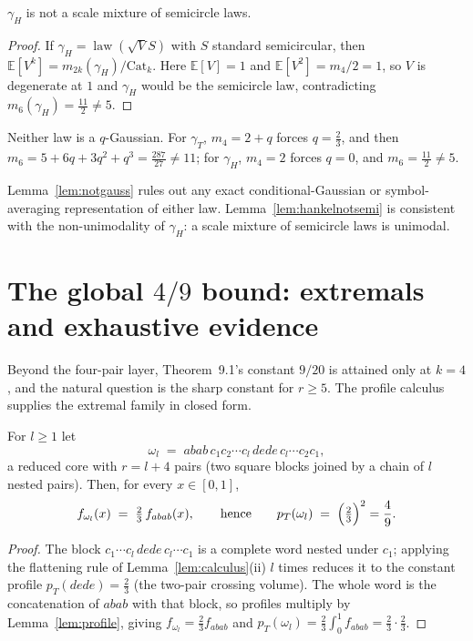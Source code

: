 \begin{lemma}\label{lem:hankelnotsemi}
$\gamma_H$ is not a scale mixture of semicircle laws.
\end{lemma}

\begin{proof}
If $\gamma_H=\operatorname{law}(\sqrt V S)$ with $S$ standard semicircular,
then $\mathbb E[V^k]=m_{2k}(\gamma_H)/\mathrm{Cat}_k$.  Here
$\mathbb E[V]=1$ and $\mathbb E[V^2]=m_4/2=1$, so $V$ is degenerate at $1$
and $\gamma_H$ would be the semicircle law, contradicting
$m_6(\gamma_H)=\tfrac{11}2\ne5$.
\end{proof}

\begin{lemma}\label{lem:notq}
Neither law is a $q$-Gaussian.  For $\gamma_T$, $m_4=2+q$ forces
$q=\tfrac23$, and then $m_6=5+6q+3q^2+q^3=\tfrac{287}{27}\ne11$; for
$\gamma_H$, $m_4=2$ forces $q=0$, and $m_6=\tfrac{11}2\ne5$.
\end{lemma}

Lemma~\ref{lem:notgauss} rules out any exact conditional-Gaussian or
symbol-averaging representation of either law.
Lemma~\ref{lem:hankelnotsemi} is consistent with the non-unimodality of
$\gamma_H$: a scale mixture of semicircle laws is unimodal.

\section{The global $4/9$ bound: extremals and exhaustive evidence}

Beyond the four-pair layer, Theorem~9.1's constant $9/20$ is attained only
at $k=4$, and the natural question is the sharp constant for $r\ge5$.  The
profile calculus supplies the extremal family in closed form.

\begin{proposition}\label{prop:family49}
For $l\ge1$ let
\[
\omega_l\;=\;abab\,c_1c_2\cdots c_l\,dede\,c_l\cdots c_2c_1 ,
\]
a reduced core with $r=l+4$ pairs (two square blocks joined by a chain of
$l$ nested pairs).  Then, for every $x\in[0,1]$,
\[
f_{\omega_l}(x)\;=\;\tfrac23\,f_{abab}(x),
\qquad\text{hence}\qquad
p_T(\omega_l)\;=\;\Bigl(\tfrac23\Bigr)^2=\frac49 .
\]
\end{proposition}

\begin{proof}
The block $c_1\cdots c_l\,dede\,c_l\cdots c_1$ is a complete word nested
under $c_1$; applying the flattening rule of
Lemma~\ref{lem:calculus}(ii) $l$ times reduces it to the constant profile
$p_T(dede)=\tfrac23$ (the two-pair crossing volume).  The whole word is
the concatenation of $abab$ with that block, so profiles multiply by
Lemma~\ref{lem:profile}, giving
$f_{\omega_l}=\tfrac23f_{abab}$ and
$p_T(\omega_l)=\tfrac23\int_0^1f_{abab}=\tfrac23\cdot\tfrac23$.
\end{proof}

